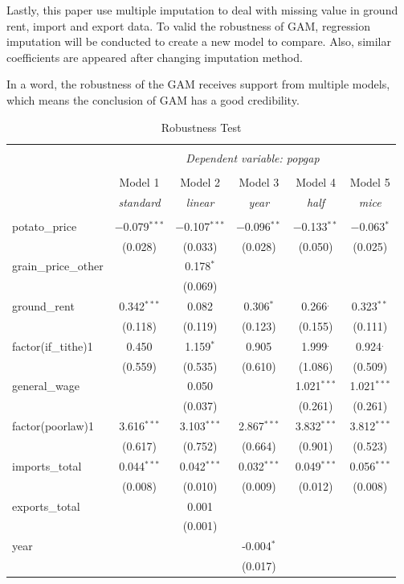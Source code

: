Lastly, this paper use multiple imputation to deal with missing value in ground rent, import and export data. To valid the robustness of GAM, regression imputation will be conducted to create a new model to compare. Also, similar coefficients are appeared after changing imputation method. 

In a word, the robustness of the GAM receives support from multiple models, which means the conclusion of GAM has a good credibility.

\begin{table}[h]
    \centering
    \caption{Robustness Test}
    \begin{tabular}{@{\extracolsep{5pt}}lccccc}
    \\[-1.8ex]\hline
    \hline \\[-1.8ex]
    & \multicolumn{5}{c}{\textit{Dependent variable: popgap}} \\
    \cline{2-6}
    \\[-1.8ex] & Model 1 & Model 2 & Model 3 & Model 4 & Model 5 \\
    & \textit{standard} & \textit{linear} & \textit{year} & \textit{half} & \textit{mice} \\
    \hline \\[-1.8ex]
    potato\_price & $-$0.079$^{***}$ & $-$0.107$^{***}$ & $-$0.096$^{**}$ & $-$0.133$^{**}$ & $-$0.063$^{*}$ \\
     & (0.028) & (0.033) & (0.028) & (0.050) & (0.025) \\
    grain\_price\_other & & 0.178$^{*}$ &  & & \\
     & & (0.069) &  & & \\
    ground\_rent & 0.342$^{***}$ & 0.082 & 0.306$^{*}$ & 0.266$^{.}$ & 0.323$^{**}$ \\
     & (0.118) & (0.119) & (0.123) & (0.155) & (0.111) \\
    factor(if\_tithe)1 & 0.450 & 1.159$^{*}$ & 0.905 & 1.999$^{.}$ & 0.924$^{.}$ \\
     & (0.559) & (0.535) & (0.610) & (1.086) & (0.509) \\
    general\_wage & & 0.050 & & 1.021$^{***}$ & 1.021$^{***}$ \\
     & & (0.037) & & (0.261) & (0.261) \\
    factor(poorlaw)1 & 3.616$^{***}$ & 3.103$^{***}$ & 2.867$^{***}$ & 3.832$^{***}$ & 3.812$^{***}$ \\
     & (0.617) & (0.752) & (0.664) & (0.901) & (0.523) \\
    imports\_total & 0.044$^{***}$ & 0.042$^{***}$ & 0.032$^{***}$ & 0.049$^{***}$ & 0.056$^{***}$ \\
     & (0.008) & (0.010) & (0.009) & (0.012) & (0.008) \\
    exports\_total & & 0.001 & & & \\
     & & (0.001) & & & \\
    year & & & -0.004$^{*}$ & & \\
     & & & (0.017) & & \\ 


\end{tabular}
\end{table}
